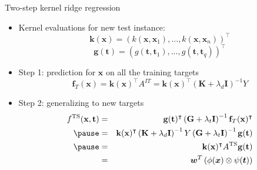 \documentclass[]{beamer}
\newcommand{\osize}{n}
\newcommand{\qsize}{q}
\newcommand{\kernelf}{k}
\newcommand{\gkernelf}{g}
\newcommand{\dkernelm}{\bm{K}}
\newcommand{\tkernelm}{\bm{G}}
\newcommand{\regparam}{\lambda}
\newcommand{\idmatrix}{\bm{I}}
\newcommand{\transpose}{^\intercal}
\newcommand{\bm}[1]{\mathbf{#1}}
\newcommand{\predfun}{f}
\newcommand{\taskset}{T}
\renewcommand{\vec}[1]{\boldsymbol{#1}}
\begin{document}
\begin{frame}{Two-step kernel ridge regression}

\vspace{0.6cm}
\begin{itemize}
\item Kernel evaluations for new test instance: 
$$\bm{k}(\bm{x})=\left(\kernelf(\bm{x},\bm{x}_1),\ldots,\kernelf(\bm{x},\bm{x}_\osize)\right)\transpose$$ 
$$\bm{g}(\bm{t})=\left(\gkernelf(\bm{t},\bm{t}_1),\ldots,\gkernelf(\bm{t},\bm{t}_\qsize)\right)\transpose$$ \pause 
\item Step 1: prediction for $\bm{x}$ on all the training targets
$$
\mathbf{\predfun}_\taskset (\bm{x}) = \bm{k}(\bm{x})\transpose A^{IT} = \bm{k}(\bm{x})\transpose \left(\dkernelm+\regparam_d \idmatrix\right)^{-1} Y  $$ \pause 
\item Step 2: generalizing to new targets
\begin{eqnarray*}
\predfun^\text{TS}(\bm{x}, \bm{t}) &=&  \bm{g}(\bm{t})\transpose \left(\tkernelm+\regparam_t \idmatrix\right)^{-1}  \mathbf{\predfun}_\taskset (\bm{x})\transpose \\ \pause 
&=& \bm{k}(\bm{x})\transpose \left(\dkernelm+\regparam_d \idmatrix\right)^{-1} Y  \left(\tkernelm+\regparam_t \idmatrix\right)^{-1} \bm{g}(\bm{t}) \\ \pause 
&=& \bm{k}(\bm{x})\transpose A^\text{TS} \bm{g}(\bm{t}) \\
&=& \vec{w}^T \left(\phi(\vec{x}) \otimes \psi(\vec{t}) \right)
\end{eqnarray*}
\end{itemize}
\end{frame}


%
%
%
\end{document}
